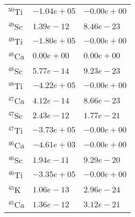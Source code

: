 \begin{tabular}{lll}
 $^{50}$Ti & $-1.04e+05 $                                                       & $-0.00e+00 $                                                          \\
 $^{49}$Sc & $1.39e-12 $                                                        & $8.46e-23 $                                                           \\
 $^{49}$Ti & $-1.80e+05 $                                                       & $-0.00e+00 $                                                          \\
 $^{48}$Ca & $0.00e+00 $                                                        & $0.00e+00 $                                                           \\
 $^{48}$Sc & $5.77e-14 $                                                        & $9.23e-23 $                                                           \\
 $^{48}$Ti & $-4.22e+05 $                                                       & $-0.00e+00 $                                                          \\
 $^{47}$Ca & $4.12e-14 $                                                        & $8.66e-23 $                                                           \\
 $^{47}$Sc & $2.43e-12 $                                                        & $1.77e-21 $                                                           \\
 $^{47}$Ti & $-3.73e+05 $                                                       & $-0.00e+00 $                                                          \\
 $^{46}$Ca & $-4.61e+03 $                                                       & $-0.00e+00 $                                                          \\
 $^{46}$Sc & $1.94e-11 $                                                        & $9.29e-20 $                                                           \\
 $^{46}$Ti & $-3.35e+05 $                                                       & $-0.00e+00 $                                                          \\
 $^{45}$K  & $1.06e-13 $                                                        & $2.96e-24 $                                                           \\
 $^{45}$Ca & $1.36e-12 $                                                        & $3.12e-21 $                                                           \\

\end{tabular}

